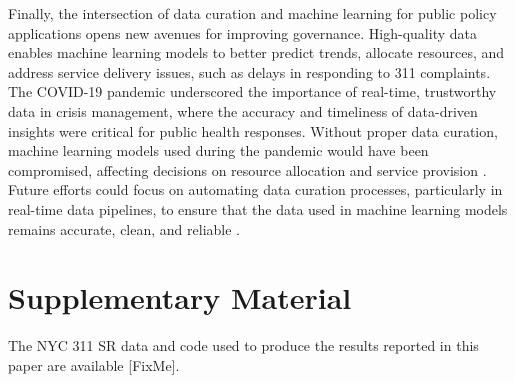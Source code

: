 \documentclass[linenumber]{jdsart}
\begin{document}
Finally, the intersection of data curation and machine learning for
public policy applications opens new avenues for improving governance.
High-quality data enables machine learning models to better predict
trends, allocate resources, and address service delivery issues, such
as delays in responding to 311 complaints. The COVID-19 pandemic
underscored the importance of real-time, trustworthy data in crisis
management, where the accuracy and timeliness of data-driven insights
were critical for public health responses. Without proper data
curation, machine learning models used during the pandemic would have
been compromised, affecting decisions on resource allocation and
service provision \citep{worby2020face, khemasuwan2021applications}.
Future efforts could focus on automating data curation processes,
particularly in real-time data pipelines, to ensure that the data used
in machine learning models remains accurate, clean, and reliable
\citep{chu2016data, hurbean2021open}.


\section*{Supplementary Material}
The NYC 311 SR data and code used to produce the results reported in
this paper are available [FixMe].




\end{document}
